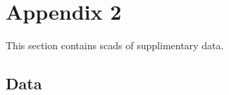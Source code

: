 \chapter{Appendix 2}\label{app2}

This section contains scads of supplimentary data.

\section{Data}

